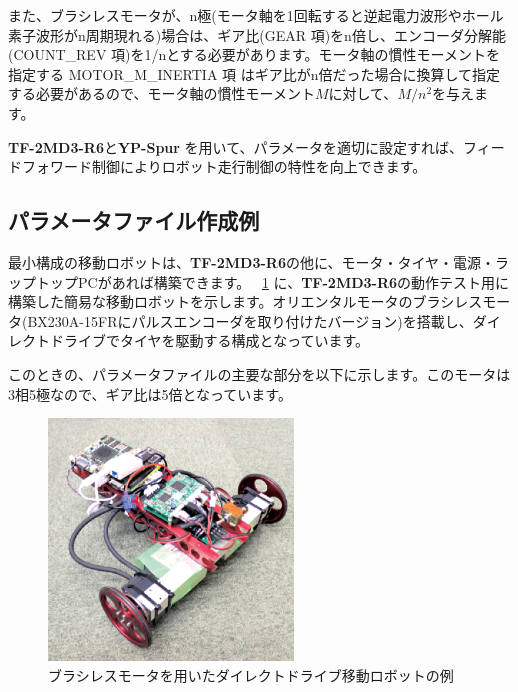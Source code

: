 \documentclass[11pt,a4j,openany,fleqn]{jbook}
\begin{document}
また、ブラシレスモータが、n極(モータ軸を1回転すると逆起電力波形やホール素子波形がn周期現れる)場合は、ギア比(GEAR 項)をn倍し、エンコーダ分解能(COUNT\_REV 項)を1/nとする必要があります。モータ軸の慣性モーメントを指定する MOTOR\_M\_INERTIA 項 はギア比がn倍だった場合に換算して指定する必要があるので、モータ軸の慣性モーメント$M$に対して、$M/n^{2}$を与えます。\par

{\bf TF-2MD3-R6}と{\bf YP-Spur} を用いて、パラメータを適切に設定すれば、フィードフォワード制御によりロボット走行制御の特性を向上できます。\par


\subsection{パラメータファイル作成例}
\label{sec:パラメータ作成例}

最小構成の移動ロボットは、{\bf TF-2MD3-R6}の他に、モータ・タイヤ・電源・ラップトップPCがあれば構築できます。
\figurename~\ref{fig:simple_robot} に、{\bf TF-2MD3-R6}の動作テスト用に構築した簡易な移動ロボットを示します。オリエンタルモータのブラシレスモータ(BX230A-15FRにパルスエンコーダを取り付けたバージョン)を搭載し、ダイレクトドライブでタイヤを駆動する構成となっています。\par
このときの、パラメータファイルの主要な部分を以下に示します。このモータは3相5極なので、ギア比は5倍となっています。\par
\begin{figure}[H]
\centering\includegraphics[width=65mm]{simple_robot.eps}
\caption{ブラシレスモータを用いたダイレクトドライブ移動ロボットの例}
\label{fig:simple_robot}
\end{figure}
\end{document}

